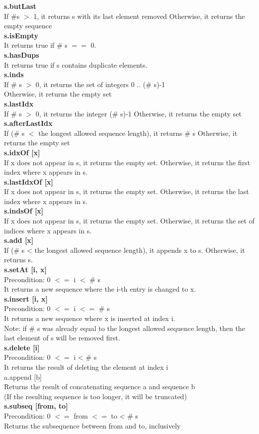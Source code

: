 \documentclass[a4paper,12pt]{extarticle}
\begin{document}
\textbf{s.butLast}\\
If \#s $>$ 1, it returns s with its last element removed
Otherwise, it returns the empty sequence\\
\textbf{s.isEmpty} \\
It returns true if \# s $==$ 0.\\
\textbf{s.hasDups} \\
It returns true if s contains duplicate elements.\\
\textbf{s.inds} \\
If \# s $>$ 0, it returns the set of integers {0 .. (\# s)-1}\\
Otherwise, it returns the empty set\\
\textbf{s.lastIdx} \\
If \# s $>$ 0, it returns the integer (\# s)-1
Otherwise, it returns the empty set\\
\textbf{s.afterLastIdx} \\
If (\# s $<$ the longest allowed sequence length), it returns \# s
Otherwise, it returns the empty set\\
\textbf{s.idxOf [x]}\\
If x does not appear in s, it returns the empty set.
Otherwise, it returns the first index where x appears in s.\\
\textbf{s.lastIdxOf [x]} \\
If x does not appear in s, it returns the empty set.
Otherwise, it returns the last index where x appears in s.\\
\textbf{s.indsOf [x]} \\
If x does not appear in s, it returns the empty set.
Otherwise, it returns the set of indices where x appears in s.\\
\textbf{s.add [x]}\\
If (\# s < the longest allowed sequence length), it appends x to s.
Otherwise, it returns s.\\
\textbf{s.setAt [i, x]}\\
Precondition: 0 $<=$ i $<$ \# s\\
It returns a new sequence where the i-th entry is changed to x.\\
\textbf{s.insert [i, x]}\\
Precondition: 0 $<=$ i $<=$ \# s\\
It returns a new sequence where x is inserted at index i.\\
Note: if \# s was already equal to the longest allowed sequence length, then the last element of s will be removed first.\\
\textbf{s.delete [i]}\\
Precondition: 0 $<=$ i < \# s\\
It returns the result of deleting the element at index i\\
a.append [b]\\
Returns the result of concatenating sequence a and sequence b\\
(If the resulting sequence is too longer, it will be truncated)\\
\textbf{s.subseq [from, to]}\\
Precondition: 0 $<=$ from $<=$ to < \# s\\
Returns the subsequence between from and to, inclusively\\
\end{document}
